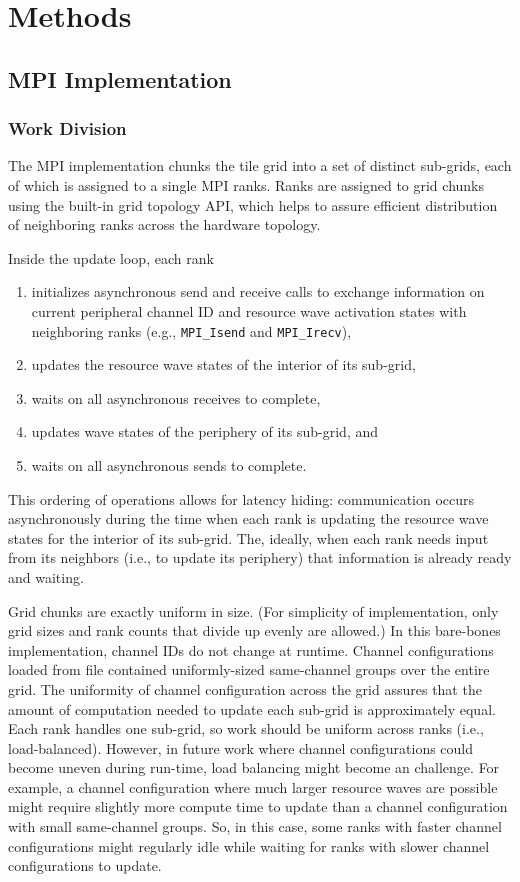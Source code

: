 \section{Methods}

\subsection{MPI Implementation}

\subsubsection{Work Division}

The MPI implementation chunks the tile grid into a set of distinct sub-grids, each of which is assigned to a single MPI ranks.
Ranks are assigned to grid chunks using the built-in grid topology API, which helps to assure efficient distribution of neighboring ranks across the hardware topology.

Inside the update loop, each rank
\begin{enumerate}
\item initializes asynchronous send and receive calls to exchange information on current peripheral channel ID and resource wave activation states with neighboring ranks (e.g., \texttt{MPI_Isend} and \texttt{MPI_Irecv}),
\item updates the resource wave states of the interior of its sub-grid,
\item waits on all asynchronous receives to complete,
\item updates wave states of the periphery of its sub-grid, and
\item waits on all asynchronous sends to complete.
\end{enumerate}

This ordering of operations allows for latency hiding: communication occurs asynchronously during the time when each rank is updating the resource wave states for the interior of its sub-grid.
The, ideally, when each rank needs input from its neighbors (i.e., to update its periphery) that information is already ready and waiting.

Grid chunks are exactly uniform in size.
(For simplicity of implementation, only grid sizes and rank counts that divide up evenly are allowed.)
In this bare-bones implementation, channel IDs do not change at runtime.
Channel configurations loaded from file contained uniformly-sized same-channel groups over the entire grid.
The uniformity of channel configuration across the grid assures that the amount of computation needed to update each sub-grid is approximately equal.
Each rank handles one sub-grid, so work should be uniform across ranks (i.e., load-balanced).
However, in future work where channel configurations could become uneven during run-time, load balancing might become an challenge.
For example, a channel configuration where much larger resource waves are possible might require slightly more compute time to update than a channel configuration with small same-channel groups.
So, in this case, some ranks with faster channel configurations might regularly idle while waiting for ranks with slower channel configurations to update.

